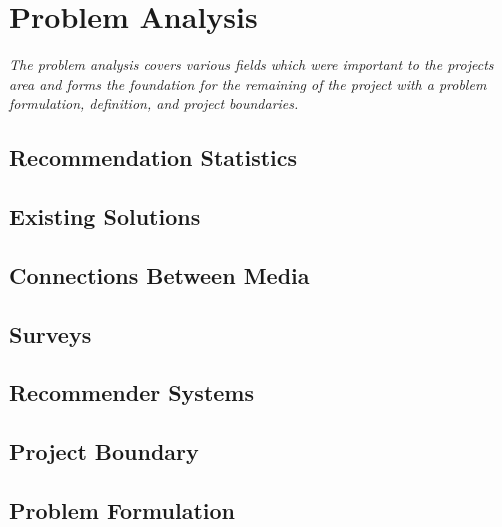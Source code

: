 \chapter{Problem Analysis}

\textit{The problem analysis covers various fields which were important to the projects area and forms the foundation for the remaining of the project with a problem formulation, definition, and project boundaries.}

\section{Recommendation Statistics}
\label{Statistics}

\section{Existing Solutions}
\label{Existing}

\section{Connections Between Media}
\label{Connections}

\section{Surveys}
\label{Surveys}

\section{Recommender Systems}
\label{RecommenderSystems}

\section{Project Boundary}
\label{Boundary}

\section{Problem Formulation}
\label{Formulation}

